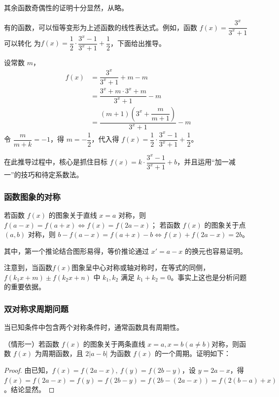 \documentclass[a4paper,openany]{ctexbook}
\begin{document}
其余函数奇偶性的证明十分显然，从略。

有的函数，可以恒等变形为上述函数的线性表达式。例如，函数 \(f(x)=\dfrac{3^x}{3^x + 1}\) 可以转化
为\(f(x)=\dfrac{1}{2}\cdot\dfrac{3^x-1}{3^x+1}+\dfrac{1}{2}\)，下面给出推导。

设常数 \(m\)，
\begin{align*}
    f(x) & =\dfrac{3^x}{3^x + 1} +m-m                                  \\
         & =\dfrac{3^x+m\cdot 3^x+m}{3^x + 1}-m                        \\
         & = \dfrac{(m+1)\left( 3^x+\dfrac{m}{m+1} \right)}{3^x + 1}-m
\end{align*}
令 \(\dfrac{m}{m+k}=-1\)，得 \(m=-\dfrac{1}{2}\)，代入得 \(f(x)=\dfrac{1}{2}\cdot\dfrac{3^x-1}{3^x+1}+\dfrac{1}{2}\)。

在此推导过程中，核心是抓住目标 \(f(x)=k\cdot \dfrac{3^x- 1}{3^x + 1}+b\)，并且运用“加一减一”的技巧和待定系数法。

\subsubsection{函数图象的对称}

若函数 \(f(x)\) 的图象关于直线 \(x=a\) 对称，则 \(f(a-x)=f(a+x) \Leftrightarrow f(x)=f(2a-x)\)；
若函数 \(f(x)\) 的图象关于点 \((a,b)\) 对称，则 \(b-f(a-x)=f(a+x)-b \Leftrightarrow f(x)+f(2a-x)=2b\)。

其中，第一个推论结合图形易得，等价推论通过 \(x'=a-x\) 的换元也容易证明。

注意到，当函数\(f(x)\)图象呈中心对称或轴对称时，在等式的同侧，\(f(k_1x+m)\pm f(k_2x+n)\) 中 \(k_1,k_2\) 满足 \(k_1+k_2=0\)。事实上这也是分析问题的重要依据。%

\subsubsection{双对称求周期问题}

当已知条件中包含两个对称条件时，通常函数具有周期性。

（情形一）若函数 \(f(x)\) 的图象关于两条直线 \(x=a,x=b(a\ne b)\)对称，则函数 \(f(x)\) 为周期函数，且 \(2|a-b|\) 为函数 \(f(x)\) 的一个周期。证明如下：

\begin{proof}
    由已知，\(f(x)=f(2a-x),\ f(y)=f(2b-y)\)，设 \(y=2a-x\)，得 \(f(x)=f(2a-x)=f(y)=f(2b-y)=f(2b-(2a-x))=f(2(b-a)+x)\)。结论显然。
\end{proof}
\end{document}

